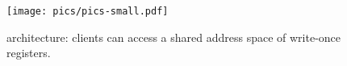 

\begin{figure}
\centering
\texttt{[image: pics/pics-small.pdf]}
\caption{\sysname{} architecture: clients can access a shared address space of write-once registers.\label{fig:arch1}}
\vspace{-0.1in}
\end{figure}

